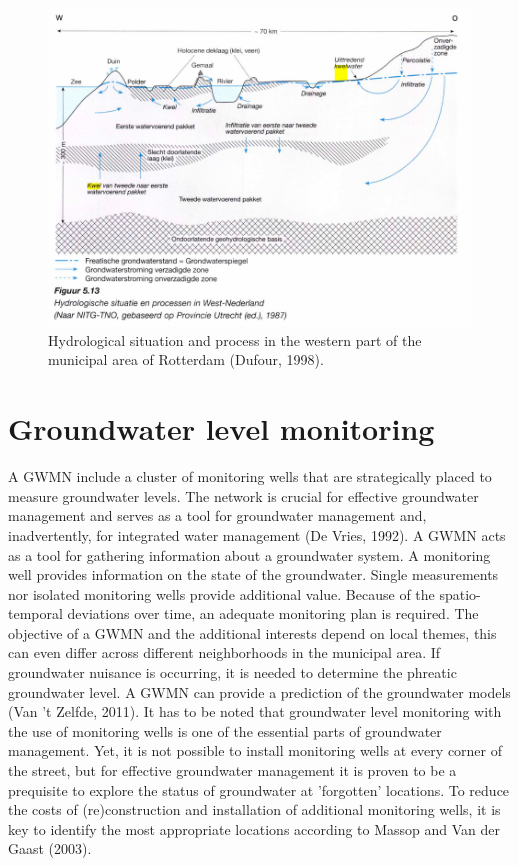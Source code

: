 \begin{figure}[h]
    \centering
    \includegraphics[width=0.95\linewidth]{figures/figures theory/dufour1998.png}
    \caption{Hydrological situation and process in the western part of the municipal area of Rotterdam (Dufour, 1998).}
    \label{dufour}
\end{figure}
\newpage
\section{Groundwater level monitoring}
A GWMN include a cluster of monitoring wells that are strategically placed to measure groundwater levels. The network is crucial for effective groundwater management and serves as a tool for groundwater management and, inadvertently, for integrated water management (De Vries, 1992). A GWMN acts as a tool for gathering information about a groundwater system. A monitoring well provides information on the state of the groundwater. Single measurements nor isolated monitoring wells provide additional value. Because of the spatio-temporal deviations over time, an adequate monitoring plan is required. The objective of a GWMN and the additional interests depend on local themes, this can even differ across different neighborhoods in the municipal area. If groundwater nuisance is occurring, it is needed to determine the phreatic groundwater level. A GWMN can provide a prediction of the groundwater models (Van 't Zelfde, 2011). It has to be noted that groundwater level monitoring with the use of monitoring wells is one of the essential parts of groundwater management. Yet, it is not possible to install monitoring wells at every corner of the street, but for effective groundwater management it is proven to be a prequisite to explore the status of groundwater at 'forgotten' locations. To reduce the costs of (re)construction and installation of additional monitoring wells, it is key to identify the most appropriate locations according to Massop and Van der Gaast (2003). 

